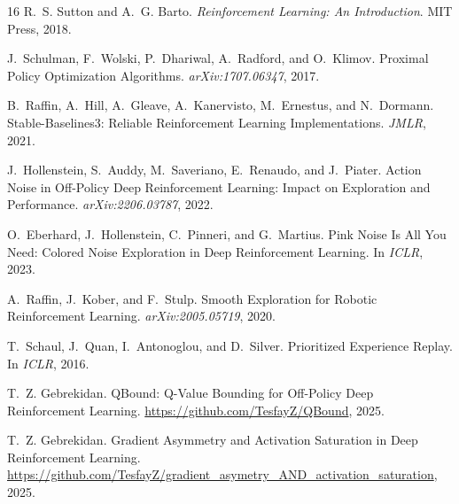 \documentclass[11pt,a4paper]{article}
\begin{document}
\begin{thebibliography}{16}
R.~S. Sutton and A.~G. Barto.
\newblock \emph{Reinforcement Learning: An Introduction}.
\newblock MIT Press, 2018.

J.~Schulman, F.~Wolski, P.~Dhariwal, A.~Radford, and O.~Klimov.
\newblock Proximal Policy Optimization Algorithms.
\newblock \emph{arXiv:1707.06347}, 2017.

B.~Raffin, A.~Hill, A.~Gleave, A.~Kanervisto, M.~Ernestus, and N.~Dormann.
\newblock Stable-Baselines3: Reliable Reinforcement Learning Implementations.
\newblock \emph{JMLR}, 2021.

J.~Hollenstein, S.~Auddy, M.~Saveriano, E.~Renaudo, and J.~Piater.
\newblock Action Noise in Off-Policy Deep Reinforcement Learning: Impact on Exploration and Performance.
\newblock \emph{arXiv:2206.03787}, 2022.

O.~Eberhard, J.~Hollenstein, C.~Pinneri, and G.~Martius.
\newblock Pink Noise Is All You Need: Colored Noise Exploration in Deep Reinforcement Learning.
\newblock In \emph{ICLR}, 2023.

A.~Raffin, J.~Kober, and F.~Stulp.
\newblock Smooth Exploration for Robotic Reinforcement Learning.
\newblock \emph{arXiv:2005.05719}, 2020.

T.~Schaul, J.~Quan, I.~Antonoglou, and D.~Silver.
\newblock Prioritized Experience Replay.
\newblock In \emph{ICLR}, 2016.

T.~Z. Gebrekidan.
\newblock QBound: Q-Value Bounding for Off-Policy Deep Reinforcement Learning.
\newblock \url{https://github.com/TesfayZ/QBound}, 2025.

T.~Z. Gebrekidan.
\newblock Gradient Asymmetry and Activation Saturation in Deep Reinforcement Learning.
\newblock \url{https://github.com/TesfayZ/gradient_asymetry_AND_activation_saturation}, 2025.

\end{thebibliography}
\end{document}
